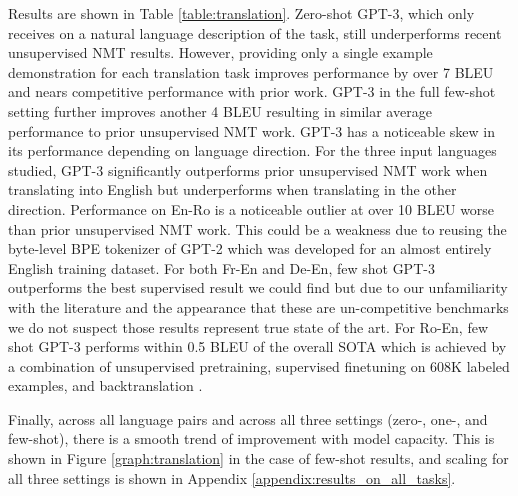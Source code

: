 

    

Results are shown in Table \ref{table:translation}. Zero-shot GPT-3, which only receives on a natural language description of the task, still underperforms recent unsupervised NMT results. However, providing only a single example demonstration for each translation task improves performance by over 7 BLEU and nears competitive performance with prior work. GPT-3 in the full few-shot setting further improves another 4 BLEU resulting in similar average performance to prior unsupervised NMT work. GPT-3 has a noticeable skew in its performance depending on language direction. For the three input languages studied, GPT-3 significantly outperforms prior unsupervised NMT work when translating into English but underperforms when translating in the other direction. Performance on En-Ro is a noticeable outlier at over 10 BLEU worse than prior unsupervised NMT work. This could be a weakness due to reusing the byte-level BPE tokenizer of GPT-2 which was developed for an almost entirely English training dataset. For both Fr-En and De-En, few shot GPT-3 outperforms the best supervised result we could find but due to our unfamiliarity with the literature and the appearance that these are un-competitive benchmarks we do not suspect those results represent true state of the art. For Ro-En, few shot GPT-3 performs within 0.5 BLEU of the overall SOTA which is achieved by a combination of unsupervised pretraining, supervised finetuning on 608K labeled examples, and backtranslation \cite{liu2019multi}.

Finally, across all language pairs and across all three settings (zero-, one-, and few-shot), there is a smooth trend of improvement with model capacity.  This is shown in Figure \ref{graph:translation} in the case of few-shot results, and scaling for all three settings is shown in Appendix \ref{appendix:results_on_all_tasks}.

